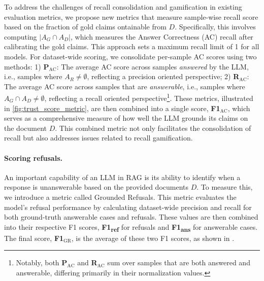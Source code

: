 \documentclass{article} %
\begin{document}
To address the challenges of recall consolidation and gamification in existing evaluation metrics, we propose new metrics that measure sample-wise recall score based on the fraction of gold claims ontainable from $D$. Specifically, this involves computing \( |A_G \cap A_D| \), which measures the Answer Correctness (AC) recall after calibrating the gold claims. This approach sets a maximum recall limit of 1 for all models. For dataset-wide scoring, we consolidate per-sample AC scores using two methods: 1) \textbf{P$_{\text{AC}}$}: The average AC score across samples \textit{answered} by the LLM, i.e., samples where $A_R \neq \emptyset$, reflecting a precision oriented perspective; 2) \textbf{R$_{\text{AC}}$}: The average AC score across samples that are \textit{answerable}, i.e., samples where ${A_G \cap A_D} \neq \emptyset$, reflecting a recall oriented perspective\footnote{Notably, both \textbf{P$_{\text{AC}}$} and \textbf{R$_{\text{AC}}$} sum over samples that are both answered and answerable, differing primarily in their normalization values.}. These metrics, illustrated in \cref{fig:trust_score_metric}, are then combined into a single score, \textbf{F1$_{\text{AC}}$}, which serves as a comprehensive measure of how well the LLM grounds its claims on the document \( D \). This combined metric not only facilitates the consolidation of recall but also addresses issues related to recall gamification. 

\paragraph{Scoring refusals.} 
An important capability of an LLM in RAG is its ability to identify when a response is unanswerable based on the provided documents \( D \). To measure this, we introduce a metric called Grounded Refusals. This metric evaluates the model's refusal performance by calculating dataset-wide precision and recall for both ground-truth answerable cases and refusals. These values are then combined into their respective F1 scores, \textbf{F1\textsubscript{ref}} for refusals and \textbf{F1\textsubscript{ans}} for answerable cases. The final score, \textbf{F1$_{\text{GR}}$}, is the average of these two F1 scores, as shown in .
\end{document}
